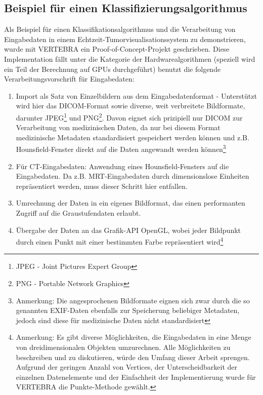 \documentclass[pdftex,a4paper,titlepage,12pt]{scrartcl}
\newtheorem[L]{boxedDefinition}{Definition}
\begin{document}
\subsection{Beispiel für einen Klassifizierungsalgorithmus}\label{ssec:algoexample}
Als Beispiel für einen Klassifikationsalgorithmus und die Verarbeitung von Eingabedaten in einem Echtzeit-Tumorvisualisationssystem zu demonstrieren, wurde mit VERTEBRA ein Proof-of-Concept-Projekt geschrieben. Diese Implementation fällt unter die Kategorie der Hardwarealgorithmen (speziell wird ein Teil der Berechnung auf GPUs durchgeführt) benutzt die folgende Verarbeitungsvorschrift für Eingabedaten:
\begin{enumerate}
 \item Import als Satz von Einzelbildern aus dem Eingabedatenformat - Unterstützt wird hier das DICOM-Format sowie diverse, weit verbreitete Bildformate, darunter JPEG\footnote{JPEG - Joint Pictures Expert Group} und PNG\footnote{PNG - Portable Network Graphics}. Davon eignet sich prizipiell nur DICOM zur Verarbeitung von medizinischen Daten, da nur bei diesem Format medizinische Metadaten standardisiert gespeichert werden können und z.B. Hounsfield-Fenster direkt auf die Daten angewandt werden können\footnote{Anmerkung: Die angesprochenen Bildformate eignen sich zwar durch die so genannten EXIF-Daten ebenfalls zur Speicherung beliebiger Metadaten, jedoch sind diese für medizinische Daten nicht standardisiert}
 \item Für CT-Eingabedaten: Anwendung eines Hounsfield-Fensters auf die Eingabedaten. Da z.B. MRT-Eingabedaten durch dimensionslose Einheiten repräsentiert werden, muss dieser Schritt hier entfallen.
 \item Umrechnung der Daten in ein eigenes Bildformat, das einen performanten Zugriff auf die Graustufendaten erlaubt.
 \item Übergabe der Daten an das Grafik-API OpenGL, wobei jeder Bildpunkt durch einen Punkt mit einer bestimmten Farbe repräsentiert wird\footnote{Anmerkung: Es gibt diverse Möglichkeiten, die Eingabedaten in eine Menge von dreidimensionalen Objekten umzurechnen. Alle Möglichkeiten zu beschreiben und zu diskutieren, würde den Umfang dieser Arbeit sprengen. Aufgrund der geringen Anzahl von Vertices, der Unterscheidbarkeit der einzelnen Datenelemente und der Einfachheit der Implementierung wurde für VERTEBRA die Punkte-Methode gewählt.}

\end{enumerate}
\end{document}
